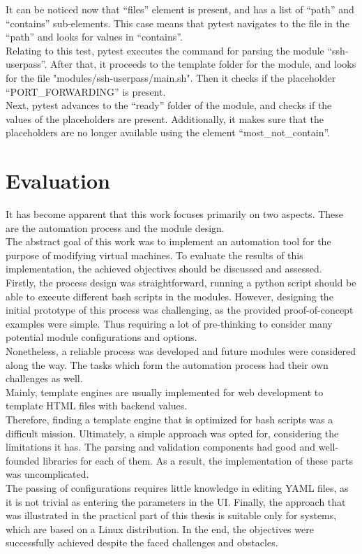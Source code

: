 It can be noticed now that “files” element is present, and has a list of “path” and “contains” sub-elements. This case means that pytest navigates to the file in the “path” and looks for values in “contains”.\\
Relating to this test, pytest executes the command for parsing the module “ssh-userpass”. After that, it proceeds to the template folder for the module, and looks for the file "modules/ssh-userpass/main.sh". Then it checks if the placeholder “PORT\_FORWARDING” is present.\\
Next, pytest advances to the “ready” folder of the module, and checks if the values of the placeholders are present. Additionally, it makes sure that the placeholders are no longer available using the element “most\_not\_contain”.\\


\section{Evaluation}
It has become apparent that this work focuses primarily on two aspects. These are the automation process and the module design.\\
The abstract goal of this work was to implement an automation tool for the purpose of modifying virtual machines. To evaluate the results of this implementation, the achieved objectives should be discussed and assessed.\\
Firstly, the process design was straightforward, running a python script should be able to execute different bash scripts in the modules. However, designing the initial prototype of this process was challenging, as the provided proof-of-concept examples were simple. Thus requiring a lot of pre-thinking to consider many potential module configurations and options.\\
Nonetheless, a reliable process was developed and future modules were considered along the way. The tasks which form the automation process had their own challenges as well.\\
Mainly, template engines are usually implemented for web development to template HTML files with backend values.\\ Therefore, finding a template engine that is optimized for bash scripts was a difficult mission. Ultimately, a simple approach was opted for, considering the limitations it has.
The parsing and validation components had good and well-founded libraries for each of them. As a result, the implementation of these parts was uncomplicated.\\
The passing of configurations requires little knowledge in editing YAML files, as it is not trivial as entering the parameters in the UI. Finally, the approach that was illustrated in the practical part of this thesis is suitable only for systems, which are based on a Linux distribution.
In the end, the objectives were successfully achieved despite the faced challenges and obstacles.

